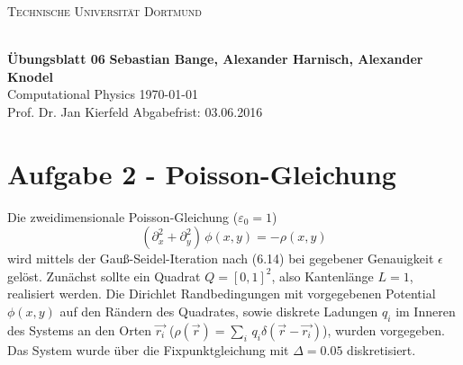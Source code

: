 
\usepackage{verbatim}
\newcommand\OverfullCenter[1]{\noindent\makebox[\linewidth]{#1}}

\noindent
\centerline{\small{\textsc{Technische Universität Dortmund}}} \\
\large\textbf{Übungsblatt 06} \hfill \footnotesize\textbf{Sebastian Bange, Alexander Harnisch, Alexander Knodel} \\
\normalsize Computational Physics \hfill \today \\
Prof. Dr. Jan Kierfeld \hfill Abgabefrist: 03.06.2016\\
\noindent\makebox[\linewidth]{\rule{\textwidth}{0.4pt}}
\section*{Aufgabe 2 - Poisson-Gleichung}
Die zweidimensionale Poisson-Gleichung ($\varepsilon_0 = 1$)
\begin{equation}
\left( \partial_x^2 + \partial_y^2 \right)\,\phi(x,y) = -\rho(x,y)
\label{eq:Poisson-GL}
\end{equation}
wird mittels der Gauß-Seidel-Iteration nach (6.14) bei gegebener Genauigkeit $\epsilon$ gelöst. Zunächst sollte ein Quadrat $Q = [0,1]^2$, also Kantenlänge $L=1$, realisiert werden. Die Dirichlet Randbedingungen mit vorgegebenen Potential $\phi(x,y)$ auf den Rändern des Quadrates, sowie diskrete Ladungen $q_i$ im Inneren des Systems an den Orten $\vec{r_i}$ ($\rho(\vec{r}) = \sum_i\,q_i\delta (\vec{r}- \vec{r_i})$), wurden vorgegeben. Das System wurde über die Fixpunktgleichung mit $\Delta = 0.05$ diskretisiert.\\
